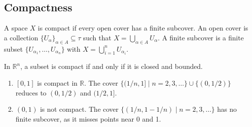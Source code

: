 \subsection{Compactness}

\begin{definition}
A space $X$ is compact if every open cover has a finite subcover. An open cover is a collection $\{U_\alpha\}_{\alpha \in A} \subseteq \tau$ such that $X = \bigcup_{\alpha \in A} U_\alpha$. A finite subcover is a finite subset $\{U_{\alpha_1}, \ldots, U_{\alpha_n}\}$ with $X = \bigcup_{i=1}^n U_{\alpha_i}$.
\end{definition}

\begin{theorem}
In $\mathbb{R}^n$, a subset is compact if and only if it is closed and bounded.
\end{theorem}

\begin{example}
\begin{enumerate}
    \item $[0,1]$ is compact in $\mathbb{R}$. The cover $\{(1/n,1] \mid n=2,3,\ldots\} \cup \{(0,1/2)\}$ reduces to $(0,1/2)$ and $(1/2,1]$.
    
    \item $(0,1)$ is not compact. The cover $\{(1/n,1-1/n) \mid n=2,3,\ldots\}$ has no finite subcover, as it misses points near 0 and 1.
\end{enumerate}
\end{example}

